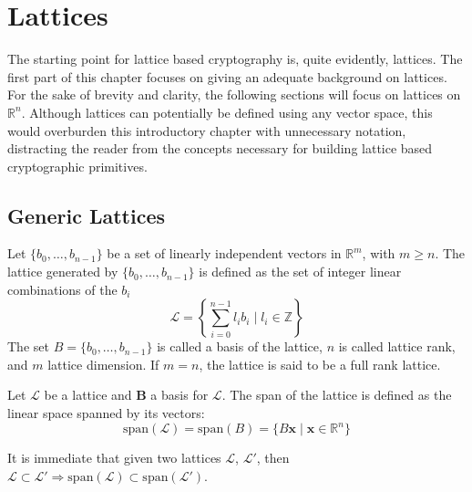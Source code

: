 \section{Lattices}

The starting point for lattice based cryptography is, quite evidently, lattices. The first part of this chapter focuses on giving an adequate background on lattices. For the sake of brevity and clarity, the following sections will focus on lattices on $\mathbb{R}^n$. Although lattices can potentially be defined using any vector space, this would overburden this introductory chapter with unnecessary notation, distracting the reader from the concepts necessary for building lattice based cryptographic primitives.

\subsection{Generic Lattices}\label{sec:bg:g_lattice}

\begin{definition}[Lattice]
Let $\{b_0,\ldots,b_{n-1}\}$ be a set of linearly independent vectors in $\mathbb{R}^m$, with $m\geq n$. The lattice generated by $\{b_0,\ldots,b_{n-1}\}$ is defined as the set of integer linear combinations of the $b_i$
\begin{equation*}
\mathscr{L}=\left\{\sum_{i=0}^{n-1}l_ib_i \mid l_i\in\mathbb{Z}\right\}
\end{equation*}
The set $B=\{b_0,\ldots,b_{n-1}\}$ is called a basis of the lattice, $n$ is called lattice rank, and $m$ lattice dimension. If $m=n$, the lattice is said to be a full rank lattice.
\end{definition}

\begin{definition}
Let $\mathscr{L}$ be a lattice and $\mathbf{B}$ a basis for $\mathscr{L}$. The span of the lattice is defined as the linear space spanned by its vectors:
\begin{equation*}
\mathrm{span}(\mathscr{L}) = \mathrm{span}(B) = \{B\mathbf{x}\mid\mathbf{x}\in\mathbb{R}^n\}
\end{equation*} 
\end{definition}

\begin{remark}
It is immediate that given two lattices $\mathscr{L}$, $\mathscr{L}'$, then $\mathscr{L}\subset \mathscr{L}' \Rightarrow \mathrm{span}(\mathscr{L}) \subset \mathrm{span}(\mathscr{L}')$.
\end{remark}


